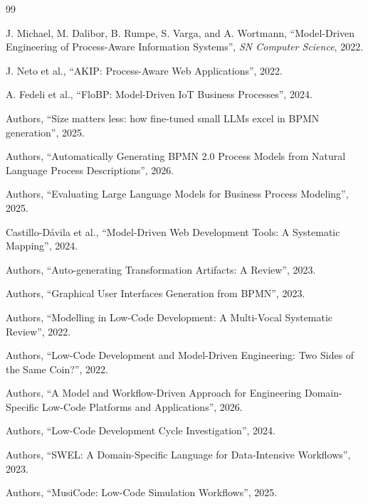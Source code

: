 \documentclass[12pt,a4paper]{article}
\begin{document}
\begin{thebibliography}{99}

J. Michael, M. Dalibor, B. Rumpe, S. Varga, and A. Wortmann, ``Model-Driven Engineering of Process-Aware Information Systems'', \textit{SN Computer Science}, 2022.

J. Neto et al., ``AKIP: Process-Aware Web Applications'', 2022.

A. Fedeli et al., ``FloBP: Model-Driven IoT Business Processes'', 2024.

Authors, ``Size matters less: how fine-tuned small LLMs excel in BPMN generation'', 2025.

Authors, ``Automatically Generating BPMN 2.0 Process Models from Natural Language Process Descriptions'', 2026.

Authors, ``Evaluating Large Language Models for Business Process Modeling'', 2025.

Castillo-Dávila et al., ``Model-Driven Web Development Tools: A Systematic Mapping'', 2024.

Authors, ``Auto-generating Transformation Artifacts: A Review'', 2023.

Authors, ``Graphical User Interfaces Generation from BPMN'', 2023.

Authors, ``Modelling in Low-Code Development: A Multi-Vocal Systematic Review'', 2022.

Authors, ``Low-Code Development and Model-Driven Engineering: Two Sides of the Same Coin?'', 2022.

Authors, ``A Model and Workflow-Driven Approach for Engineering Domain-Specific Low-Code Platforms and Applications'', 2026.

Authors, ``Low-Code Development Cycle Investigation'', 2024.

Authors, ``SWEL: A Domain-Specific Language for Data-Intensive Workflows'', 2023.

Authors, ``MusiCode: Low-Code Simulation Workflows'', 2025.

\end{thebibliography}
\end{document}

